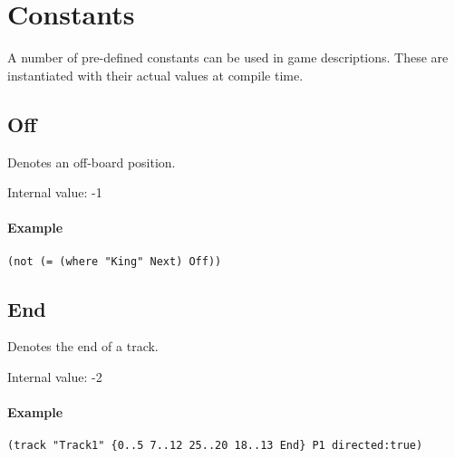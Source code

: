 \chapter{Constants}  \label{Chapter:Constants}


A number of pre-defined constants can be used in game descriptions. 
These are instantiated with their actual values at compile time.


\section{Off}

Denotes an off-board position.

\phantom{}
\noindent
Internal value: -1 

\vspace{1mm}
\subsubsection*{Example}
\begin{formatbox}
\noindent\begin{minipage}{\textwidth}
\begin{verbatim}
(not (= (where "King" Next) Off))
\end{verbatim}
\end{minipage}
\end{formatbox}


\section{End}

Denotes the end of a track.

\phantom{}
\noindent
Internal value: -2 

\vspace{1mm}
\subsubsection*{Example}
\begin{formatbox}
\noindent\begin{minipage}{\textwidth}
\begin{verbatim}
(track "Track1" {0..5 7..12 25..20 18..13 End} P1 directed:true)
\end{verbatim}
\end{minipage}
\end{formatbox}

